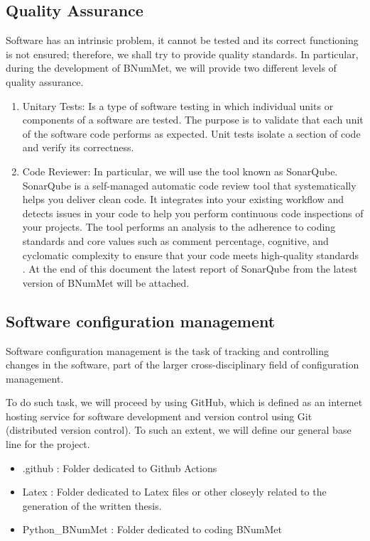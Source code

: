 \subsection{Quality Assurance}
Software has an intrinsic problem, it cannot be tested and its correct functioning is not ensured; therefore, we shall try to provide quality standards. In particular, during the development of BNumMet, we will provide two different levels of quality assurance.
\begin{enumerate}
    \item Unitary Tests: Is a type of software testing in which individual units or components of a software are tested. The purpose is to validate that each unit of the software code performs as expected.  Unit tests isolate a section of code and verify its correctness. 
    
    \item Code Reviewer: In particular, we will use the tool known as SonarQube. SonarQube is a self-managed automatic code review tool that systematically helps you deliver clean code. It integrates into your existing workflow and detects issues in your code to help you perform continuous code inspections of your projects. The tool performs an analysis to the adherence to coding standards and core values such as comment percentage, cognitive, and cyclomatic complexity to ensure that your code meets high-quality standards \cite{sonarsource} \cite{sonarqube}. At the end of this document the latest report of SonarQube from the latest version of BNumMet will be attached.
\end{enumerate}


\subsection{Software configuration management}
Software configuration management is the task of tracking and controlling changes in the software, part of the larger cross-disciplinary field of configuration management.\cite{Pre94}

To do such task, we will proceed by using GitHub, which is defined as an internet hosting service for software development and version control using Git (distributed version control). To such an extent, we will define our general base line for the project.
\begin{itemize}
    \item .github : Folder dedicated to Github Actions
    \item Latex : Folder dedicated to Latex files or other closeyly related to the generation of the written thesis.
    \item Python\_BNumMet : Folder dedicated to coding BNumMet
\end{itemize}

